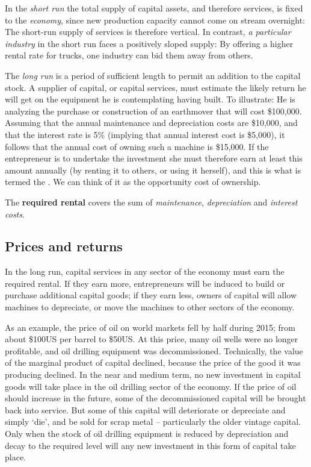 In the \textit{short run} the total supply of capital assets, and therefore
services, is fixed to the \textit{economy}, since new production capacity
cannot come on stream overnight: The short-run supply of services is
therefore vertical. In contrast, \textit{a particular industry} in the short
run faces a positively sloped supply: By offering a higher rental rate for
trucks, one industry can bid them away from others.

The \textit{long run} is a period of sufficient length to permit an addition
to the capital stock. A supplier of capital, or capital services, must
estimate the likely return he will get on the equipment he is contemplating
having built. To illustrate: He is analyzing the purchase or construction of
an earthmover that will cost \$100,000. Assuming that the annual maintenance
and depreciation costs are \$10,000, and that the interest rate is 5\%
(implying that annual interest cost is \$5,000), it follows that the annual
cost of owning such a machine is \$15,000. If the entrepreneur is to
undertake the investment she must therefore earn at least this amount
annually (by renting it to others, or using it herself), and this is what is
termed the . We can think of it as the
opportunity cost of ownership.

\begin{DefBox}
The \textbf{required rental} covers the sum of \textit{maintenance}, \textit{depreciation} and \textit{interest costs}.
\end{DefBox}

\newhtmlpage

\subsection*{Prices and returns}

In the long run, capital services in any sector of the economy must earn the
required rental. If they earn more, entrepreneurs will be induced to build
or purchase additional capital goods; if they earn less, owners of capital
will allow machines to depreciate, or move the machines to other sectors of
the economy. 

As an example, the price of oil on world markets fell by half during 2015;
from about \$100US per barrel to \$50US. At this price, many oil wells were
no longer profitable, and oil drilling equipment was decommissioned.
Technically, the value of the marginal product of capital declined, because
the price of the good it was producing declined. In the near and medium
term, no new investment in capital goods will take place in the oil drilling
sector of the economy. If the price of oil should increase in the future,
some of the decommissioned capital will be brought back into service. But
some of this capital will deteriorate or depreciate and simply `die', and be
sold for scrap metal -- particularly the older vintage capital. Only when the
stock of oil drilling equipment is reduced by depreciation and decay to the
required level will any new investment in this form of capital take place. 

